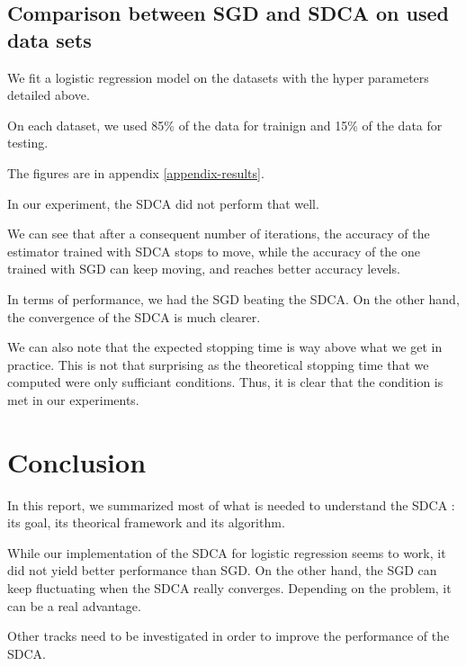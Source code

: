 \documentclass{article}
\begin{document}
\subsection{Comparison between SGD and SDCA on used data sets}

We fit a logistic regression model on the datasets with the hyper parameters detailed above.

On each dataset, we used 85\% of the data for trainign and 15\% of the data for testing.

The figures are in appendix \ref{appendix-results}.

In our experiment, the SDCA did not perform that well.

We can see that after a consequent number of iterations, the accuracy of the estimator trained with SDCA stops to move, while the accuracy of the one trained with SGD can keep moving, and reaches better accuracy levels.

In terms of performance, we had the SGD beating the SDCA.
On the other hand, the convergence of the SDCA is much clearer.

We can also note that the expected stopping time is way above what we get in practice.
This is not that surprising as the theoretical stopping time that we computed were only sufficiant conditions.
Thus, it is clear that the condition is met in our experiments.

\section*{Conclusion}

In this report, we summarized most of what is needed to understand the SDCA : its goal, its theorical framework and its algorithm.

While our implementation of the SDCA for logistic regression seems to work, it did not yield better performance than SGD.
On the other hand, the SGD can keep fluctuating when the SDCA really converges.
Depending on the problem, it can be a real advantage.

Other tracks need to be investigated in order to improve the performance of the SDCA.
\end{document}
